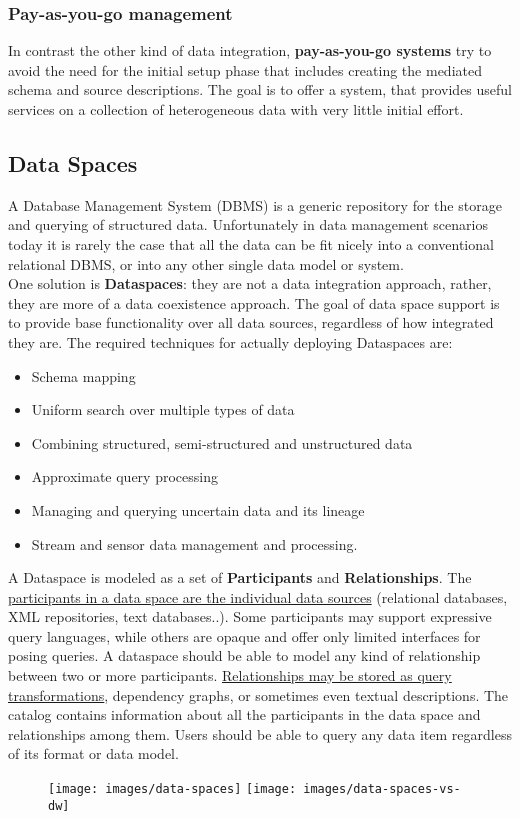 \documentclass[10pt,a4paper]{article}
\begin{document}
\subsubsection{Pay-as-you-go management}
In contrast the other kind of data integration, \textbf{pay-as-you-go systems} try to avoid the need for the initial setup phase that includes creating the mediated schema and source descriptions. The goal is to offer a system, that provides useful services on a collection of heterogeneous data with very little initial effort.
\subsection{Data Spaces}
A Database Management System (DBMS) is a generic repository for the storage and querying of structured data. Unfortunately in data management scenarios today it is rarely the case that all the data can be fit nicely into a conventional relational DBMS, or into any other single data model or system. \\
One solution is \textbf{Dataspaces}: they are not a data integration approach, rather, they are more of a data coexistence approach. The goal of data space support is to provide base functionality over all data sources, regardless of how integrated they are.
The required techniques for actually deploying Dataspaces are:
\begin{itemize}
	\item Schema mapping
	\item Uniform search over multiple types of data
	\item Combining structured, semi-structured and unstructured data
	\item Approximate query processing
	\item Managing and querying uncertain data and its lineage
	\item Stream and sensor data management and processing.
\end{itemize}
A Dataspace is modeled as a set of \textbf{Participants} and \textbf{Relationships}. The \uline{participants in a data space are the individual data sources} (relational databases, XML repositories, text databases..). Some participants may support expressive query languages, while others are opaque and offer only limited interfaces for posing queries. A dataspace should be able to model any kind of relationship between two or more participants. \uline{Relationships may be stored as query transformations}, dependency graphs, or sometimes even textual descriptions. The catalog contains information about all the participants in the data space and relationships among them.
Users should be able to query any data item regardless of its format or data model.
\begin{figure}[htp]
\centering
\texttt{[image: images/data-spaces]}\hfill
\texttt{[image: images/data-spaces-vs-dw]}\hfill
\end{figure}
\pagebreak
\end{document}
